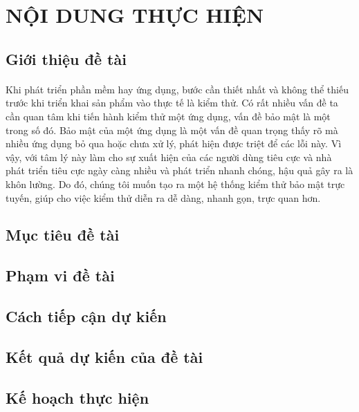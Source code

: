 \newpage

\section{NỘI DUNG THỰC HIỆN}

\subsection{Giới thiệu đề tài}
\paragraph{}
Khi phát triển phần mềm hay ứng dụng, bước cần thiết nhất và không thể thiếu 
trước khi triển khai sản phẩm vào thực tế là kiểm thử. Có rất nhiều vấn đề ta cần 
quan tâm khi tiến hành kiểm thử một ứng dụng, vấn đề bảo mật là một trong số đó. Bảo mật 
của một ứng dụng là một vấn đề quan trọng thấy rõ mà nhiều ứng dụng bỏ qua hoặc chưa xử lý, phát hiện
được triệt để các lỗi này. Vì vậy, với tâm lý này làm cho sự xuất hiện của các người dùng tiêu cực và 
nhà phát triển tiêu cực ngày càng nhiều và phát triển nhanh chóng, hậu quả gây ra là khôn lường.
Do đó, chúng tôi muốn tạo ra một hệ thống kiểm thử bảo mật trực tuyến, giúp cho việc kiểm thử diễn ra dễ dàng, 
nhanh gọn, trực quan hơn.
\subsection{Mục tiêu đề tài}

\subsection{Phạm vi đề tài}

\subsection{Cách tiếp cận dự kiến}

\subsection{Kết quả dự kiến của đề tài}

\subsection{Kế hoạch thực hiện}